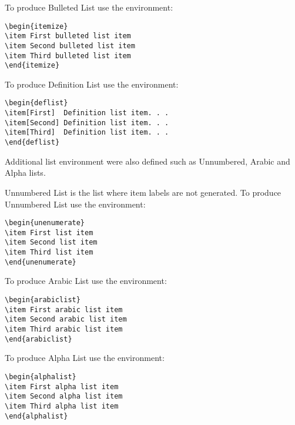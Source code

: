 \documentclass{clv3}
\begin{document}
To produce Bulleted List use the environment:

\begin{verbatim}
\begin{itemize}
\item First bulleted list item
\item Second bulleted list item
\item Third bulleted list item
\end{itemize}
\end{verbatim}

To produce Definition List use the environment:

\begin{verbatim}
\begin{deflist}
\item[First]  Definition list item. . .
\item[Second] Definition list item. . .
\item[Third]  Definition list item. . .
\end{deflist}
\end{verbatim}

Additional list environment were also defined such as Unnumbered, Arabic and Alpha lists.

Unnumbered List is the list where item labels are not generated. To produce Unnumbered List use the environment:

\begin{verbatim}
\begin{unenumerate}
\item First list item
\item Second list item
\item Third list item
\end{unenumerate}
\end{verbatim}

To produce Arabic List use the environment:

\begin{verbatim}
\begin{arabiclist}
\item First arabic list item
\item Second arabic list item
\item Third arabic list item
\end{arabiclist}
\end{verbatim}

To produce Alpha List use the environment:

\begin{verbatim}
\begin{alphalist}
\item First alpha list item
\item Second alpha list item
\item Third alpha list item
\end{alphalist}
\end{verbatim}
\end{document}
